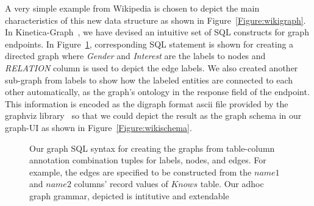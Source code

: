 \documentclass[preprint,3p,twocolumn]{elsarticle}
\begin{document}
A very simple example from Wikipedia is chosen to depict the main characteristics of this new data structure 
as shown in Figure~\ref{Figure:wikigraph}. In Kinetica-Graph~\cite{kineticagraph},  we have devised an intuitive set of SQL constructs for graph endpoints. In Figure~\ref{Figure:wikisql}, corresponding SQL statement is shown for creating a directed graph where \textit{Gender} and \textit{Interest} are the labels to nodes and \textit{RELATION} column is used to depict the edge labels. We also created another sub-graph from labels to show how the labeled entities are connected to each other automatically, as the graph's ontology in the response field of the endpoint. This information is encoded as the digraph format ascii file provided by the graphviz library~\cite{graphviz} so that we could depict the result as the graph schema in our graph-UI as shown in Figure~\ref{Figure:wikischema}.

\begin{figure}
\centering
    \caption{Our graph SQL syntax for creating the graphs from table-column annotation combination tuples for labels, nodes, and edges. For example, the edges are specified to be constructed from the $name1$ and $name2$ columns' record values of $Knows$ table. Our adhoc graph grammar, depicted  is intitutive and extendable }
    \label{Figure:wikisql}
\end{figure}
\end{document}
